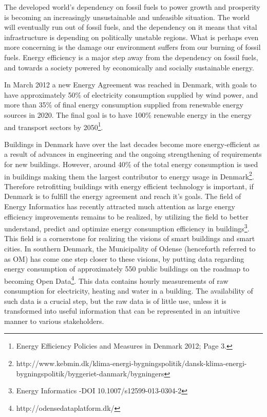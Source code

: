 The developed world’s dependency on fossil fuels to power growth and prosperity is becoming an increasingly unsustainable and unfeasible situation. The world will eventually run out of fossil fuels, and the dependency on it means that vital infrastructure is depending on politically unstable regions. What is perhaps even more concerning is the damage our environment suffers from our burning of fossil fuels. Energy efficiency is a major step away from the dependency on fossil fuels, and towards a society powered by economically and socially sustainable energy. 

In March 2012 a new Energy Agreement was reached in Denmark, with goals to have approximately 50\% of electricity consumption supplied by wind power, and more than 35\% of final energy consumption supplied from renewable energy sources in 2020. The final goal is to have 100\% renewable energy in the energy and transport sectors by 2050\footnote{Energy Efficiency Policies and Measures in Denmark 2012; Page 3.}.

Buildings in Denmark have over the last decades become more energy-efficient as a result of advances in engineering and the ongoing strengthening of requirements for new buildings. However, around 40\% of the total energy consumption  is used in buildings making them the largest contributor to energy usage in Denmark\footnote{http://www.kebmin.dk/klima-energi-bygningspolitik/dansk-klima-energi-bygningspolitik/byggeriet-danmark/bygningers}. Therefore retrofitting buildings with energy efficient technology is important, if Denmark is to fulfill the energy agreement and reach it’s goals. The field of Energy Informatics has recently attracted much attention as large energy efficiency improvements remains to be realized, by utilizing the field to better understand, predict and optimize energy consumption efficiency in buildings\footnote{Energy Informatics -DOI 10.1007/s12599-013-0304-2}. This field is a cornerstone for realizing the visions of smart buildings and smart cities. In southern Denmark, the Municipality of Odense (henceforth referred to as OM) has come one step closer to these visions, by putting data regarding energy consumption of approximately 550 public buildings on the roadmap to becoming Open Data\footnote{http://odensedataplatform.dk/}. This data contains hourly measurements of raw consumption for electricity, heating and water in a building. The availability of such data is a crucial step, but the raw data is of little use, unless it is transformed into useful information that can be represented in an intuitive manner to various stakeholders.

